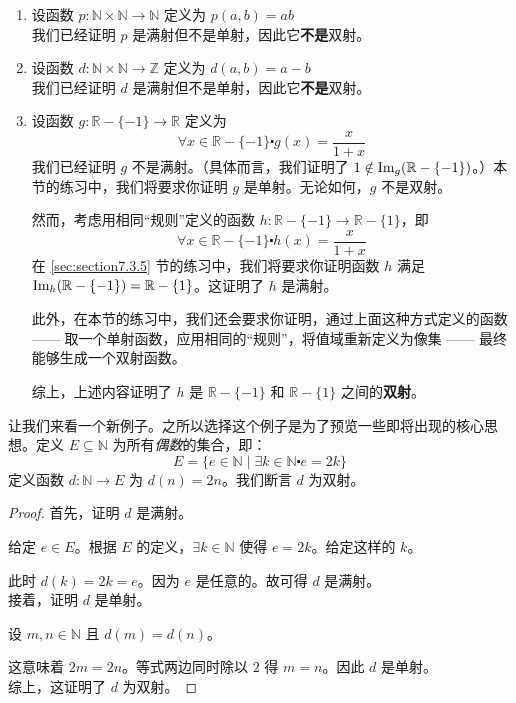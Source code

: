 \begin{example}
    \begin{enumerate}[label=(\alph*)]
        \item 设函数 $p:\mathbb{N} \times \mathbb{N} \to \mathbb{N}$ 定义为 $p(a, b) = ab$ \\
            我们已经证明 $p$ 是满射但不是单射，因此它\textbf{不是}双射。
        \item 设函数 $d:\mathbb{N} \times \mathbb{N} \to \mathbb{Z}$ 定义为 $d(a, b) = a-b$ \\
            我们已经证明 $d$ 是满射但不是单射，因此它\textbf{不是}双射。
        \item 设函数 $g : \mathbb{R} - \{-1\} \to \mathbb{R}$ 定义为 
             \[\forall x \in \mathbb{R} - \{-1\} \centerdot g(x) = \frac{x}{1+x}\]
             我们已经证明 $g$ 不是满射。（具体而言，我们证明了 $ 1 \notin \text{Im}_g(\mathbb{R} - \{-1\})$。）本节的练习中，我们将要求你证明 $g$ 是单射。无论如何，$g$ 不是双射。

             然而，考虑用相同``规则''定义的函数 $h : \mathbb{R} - \{-1\} \to \mathbb{R}- \{1\}$，即
             \[\forall x \in \mathbb{R} - \{-1\} \centerdot h(x) = \frac{x}{1+x}\]
             在 \ref{sec:section7.3.5} 节的练习中，我们将要求你证明函数 $h$ 满足 $\text{Im}_h(\mathbb{R} - \{-1\}) = \mathbb{R}- \{1\}$。这证明了 $h$ 是满射。

             此外，在本节的练习中，我们还会要求你证明，通过上面这种方式定义的函数 —— 取一个单射函数，应用相同的``规则''，将值域重新定义为像集 —— 最终能够生成一个双射函数。

             综上，上述内容证明了 $h$ 是 $\mathbb{R} - \{-1\}$ 和 $\mathbb{R}- \{1\}$ 之间的\textbf{双射}。
    \end{enumerate}
\end{example}

\begin{example}
    让我们来看一个新例子。之所以选择这个例子是为了预览一些即将出现的核心思想。定义 $E \subseteq \mathbb{N}$ 为所有\emph{偶数}的集合，即：
    \[E = \{e \in \mathbb{N} \mid \exists k \in \mathbb{N} \centerdot e = 2k\}\]
    定义函数 $d : \mathbb{N} \to E$ 为 $d(n) = 2n$。我们断言 $d$ 为双射。

    \begin{proof}
        首先，证明 $d$ 是满射。
        
        给定 $e \in E$。根据 $E$ 的定义，$\exists k \in \mathbb{N}$ 使得 $e = 2k$。给定这样的 $k$。

        此时 $d(k) = 2k = e$。因为 $e$ 是任意的。故可得 $d$ 是满射。\\

        接着，证明 $d$ 是单射。

        设 $m,n \in \mathbb{N}$ 且 $d(m) = d(n)$。

        这意味着 $2m=2n$。等式两边同时除以 $2$ 得 $m=n$。因此 $d$ 是单射。\\

        综上，这证明了 $d$ 为双射。
    \end{proof}
\end{example}

